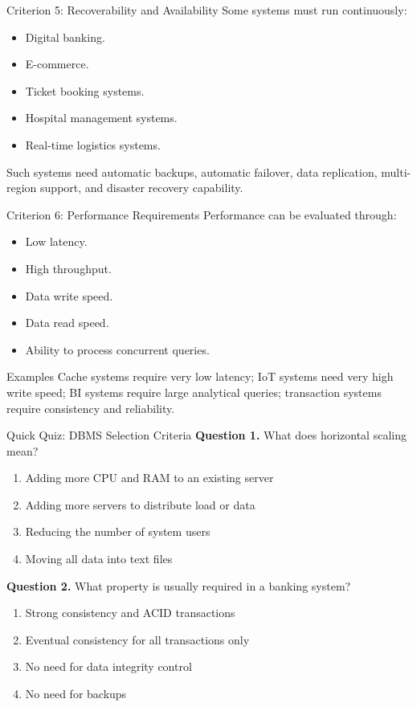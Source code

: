 \documentclass[aspectratio=169,11pt]{beamer}
\newcommand{\smallitem}{\setlength{\itemsep}{2pt}\setlength{\parskip}{0pt}}
\newcommand{\qoption}[2]{\item[#1.] #2}
\begin{document}
\begin{frame}{Criterion 5: Recoverability and Availability}
Some systems must run continuously:
\begin{itemize}
  \smallitem
  \item Digital banking.
  \item E-commerce.
  \item Ticket booking systems.
  \item Hospital management systems.
  \item Real-time logistics systems.
\end{itemize}

Such systems need automatic backups, automatic failover, data replication, multi-region support, and disaster recovery capability.
\end{frame}

\begin{frame}{Criterion 6: Performance Requirements}
Performance can be evaluated through:
\begin{itemize}
  \smallitem
  \item Low latency.
  \item High throughput.
  \item Data write speed.
  \item Data read speed.
  \item Ability to process concurrent queries.
\end{itemize}

\begin{exampleblock}{Examples}
Cache systems require very low latency; IoT systems need very high write speed; BI systems require large analytical queries; transaction systems require consistency and reliability.
\end{exampleblock}
\end{frame}

\begin{frame}{Quick Quiz: DBMS Selection Criteria}
\small
\textbf{Question 1.} What does horizontal scaling mean?
\begin{enumerate}
  \qoption{A}{Adding more CPU and RAM to an existing server}
  \qoption{B}{Adding more servers to distribute load or data}
  \qoption{C}{Reducing the number of system users}
  \qoption{D}{Moving all data into text files}
\end{enumerate}

\textbf{Question 2.} What property is usually required in a banking system?
\begin{enumerate}
  \qoption{A}{Strong consistency and ACID transactions}
  \qoption{B}{Eventual consistency for all transactions only}
  \qoption{C}{No need for data integrity control}
  \qoption{D}{No need for backups}
\end{enumerate}
\end{frame}
\end{document}
